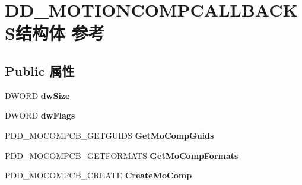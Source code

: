 \hypertarget{struct_d_d___m_o_t_i_o_n_c_o_m_p_c_a_l_l_b_a_c_k_s}{}\section{D\+D\+\_\+\+M\+O\+T\+I\+O\+N\+C\+O\+M\+P\+C\+A\+L\+L\+B\+A\+C\+K\+S结构体 参考}
\label{struct_d_d___m_o_t_i_o_n_c_o_m_p_c_a_l_l_b_a_c_k_s}
\subsection*{Public 属性}
\begin{DoxyCompactItemize}
\item 
\mbox{\label{struct_d_d___m_o_t_i_o_n_c_o_m_p_c_a_l_l_b_a_c_k_s_aa7037b28db04de0655042d6427d73985}} 
D\+W\+O\+RD {\bfseries dw\+Size}
\item 
\mbox{\label{struct_d_d___m_o_t_i_o_n_c_o_m_p_c_a_l_l_b_a_c_k_s_a3f9bca9657f09502458b9b5e1ed1fa37}} 
D\+W\+O\+RD {\bfseries dw\+Flags}
\item 
\mbox{\label{struct_d_d___m_o_t_i_o_n_c_o_m_p_c_a_l_l_b_a_c_k_s_a5a4829c03410d176e636bb918cf25625}} 
P\+D\+D\+\_\+\+M\+O\+C\+O\+M\+P\+C\+B\+\_\+\+G\+E\+T\+G\+U\+I\+DS {\bfseries Get\+Mo\+Comp\+Guids}
\item 
\mbox{\label{struct_d_d___m_o_t_i_o_n_c_o_m_p_c_a_l_l_b_a_c_k_s_a170147b76e1d5d9eff76445c353d7ac8}} 
P\+D\+D\+\_\+\+M\+O\+C\+O\+M\+P\+C\+B\+\_\+\+G\+E\+T\+F\+O\+R\+M\+A\+TS {\bfseries Get\+Mo\+Comp\+Formats}
\item 
\mbox{\label{struct_d_d___m_o_t_i_o_n_c_o_m_p_c_a_l_l_b_a_c_k_s_a23b52113c3708fd47cb952aab6b4ac55}} 
P\+D\+D\+\_\+\+M\+O\+C\+O\+M\+P\+C\+B\+\_\+\+C\+R\+E\+A\+TE {\bfseries Create\+Mo\+Comp}
\item 
\mbox{\label{struct_d_d___m_o_t_i_o_n_c_o_m_p_c_a_l_l_b_a_c_k_s_a9aaeef706f8bd03467d1f3a8a5156a7d}} 

\end{DoxyCompactItemize}

